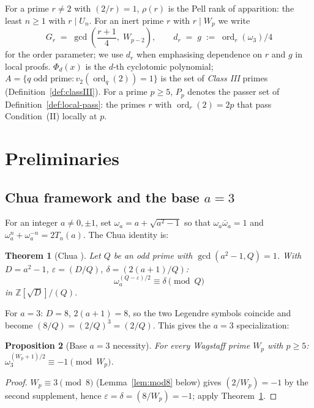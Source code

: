 \documentclass[11pt]{amsart}
\theoremstyle{plain}
\newtheorem{theorem}{Theorem}[section]
\newtheorem{proposition}[theorem]{Proposition}
\theoremstyle{definition}
\theoremstyle{remark}
\numberwithin{equation}{section}
\newcommand{\ord}{\operatorname{ord}}
\newcommand{\Z}{\mathbb{Z}}
\begin{document}
For a prime $r \neq 2$ with $(2/r) = 1$, $\rho(r)$ is the Pell rank of apparition: the least $n \geq 1$ with $r \mid U_n$. For an inert prime $r$ with $r \mid W_p$ we write
\[
  G_r \;=\; \gcd\!\left(\frac{r+1}{4},\; W_{p-2}\right), \qquad d_r \;=\; g \;:=\; \ord_r(\omega_3)/4
\]
for the order parameter; we use $d_r$ when emphasising dependence on $r$ and $g$ in local proofs. $\Phi_d(x)$ is the $d$-th cyclotomic polynomial; $A = \{q \text{ odd prime} : v_2(\ord_q(2)) = 1\}$ is the set of \emph{Class III} primes (Definition~\ref{def:classIII}). For a prime $p \geq 5$, $P_p$ denotes the passer set of Definition~\ref{def:local-pass}: the primes $r$ with $\ord_r(2) = 2p$ that pass Condition~(II) locally at $p$.

\section{Preliminaries}\label{sec:prelim}

\subsection{Chua framework and the base \texorpdfstring{$a = 3$}{a = 3}}

For an integer $a \neq 0, \pm 1$, set $\omega_a = a + \sqrt{a^2 - 1}$ so that $\omega_a \bar\omega_a = 1$ and $\omega_a^n + \omega_a^{-n} = 2 T_n(a)$. The Chua identity is:

\begin{theorem}[Chua \cite{ref:Chua}]\label{thm:chua}
Let $Q$ be an odd prime with $\gcd(a^2 - 1, Q) = 1$. With $D = a^2 - 1$, $\varepsilon = (D/Q)$, $\delta = (2(a+1)/Q)$:
\[
  \omega_a^{(Q - \varepsilon)/2} \equiv \delta \pmod Q
\]
in $\Z[\sqrt{D}]/(Q)$.
\end{theorem}

For $a = 3$: $D = 8$, $2(a+1) = 8$, so the two Legendre symbols coincide and become $(8/Q) = (2/Q)^3 = (2/Q)$. This gives the $a = 3$ specialization:

\begin{proposition}[Base $a = 3$ necessity]\label{prop:necessity}
For every Wagstaff prime $W_p$ with $p \geq 5$: $\omega_3^{(W_p + 1)/2} \equiv -1 \pmod{W_p}$.
\end{proposition}

\begin{proof}
$W_p \equiv 3 \pmod 8$ (Lemma~\ref{lem:mod8} below) gives $(2/W_p) = -1$ by the second supplement, hence $\varepsilon = \delta = (8/W_p) = -1$; apply Theorem~\ref{thm:chua}.
\end{proof}
\end{document}
